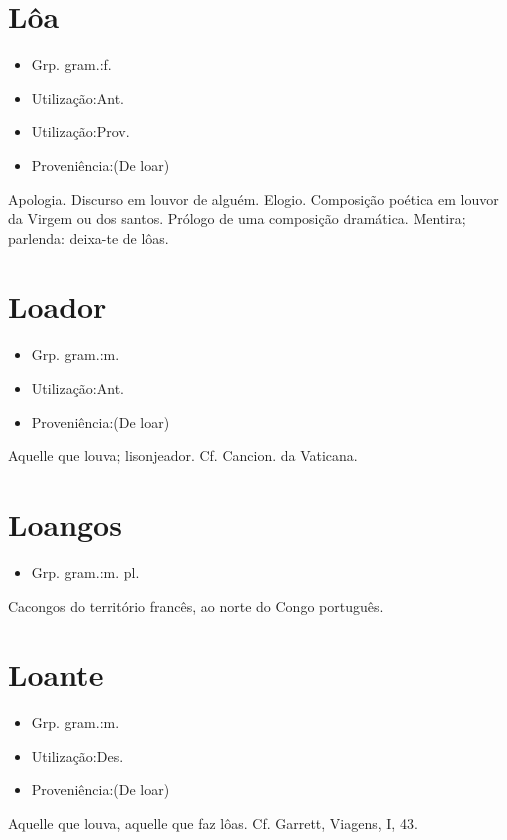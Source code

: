\section{Lôa}
\begin{itemize}
\item {Grp. gram.:f.}
\end{itemize}
\begin{itemize}
\item {Utilização:Ant.}
\end{itemize}
\begin{itemize}
\item {Utilização:Prov.}
\end{itemize}
\begin{itemize}
\item {Proveniência:(De \textunderscore loar\textunderscore )}
\end{itemize}
Apologia.
Discurso em louvor de alguém.
Elogio.
Composição poética em louvor da Virgem ou dos santos.
Prólogo de uma composição dramática.
Mentira; parlenda: \textunderscore deixa-te de lôas\textunderscore .
\section{Loador}
\begin{itemize}
\item {Grp. gram.:m.}
\end{itemize}
\begin{itemize}
\item {Utilização:Ant.}
\end{itemize}
\begin{itemize}
\item {Proveniência:(De \textunderscore loar\textunderscore )}
\end{itemize}
Aquelle que louva; lisonjeador. Cf. \textunderscore Cancion. da Vaticana\textunderscore .
\section{Loangos}
\begin{itemize}
\item {Grp. gram.:m. pl.}
\end{itemize}
Cacongos do território francês, ao norte do Congo português.
\section{Loante}
\begin{itemize}
\item {Grp. gram.:m.}
\end{itemize}
\begin{itemize}
\item {Utilização:Des.}
\end{itemize}
\begin{itemize}
\item {Proveniência:(De \textunderscore loar\textunderscore )}
\end{itemize}
Aquelle que louva, aquelle que faz lôas. Cf. Garrett, \textunderscore Viagens\textunderscore , I, 43.
